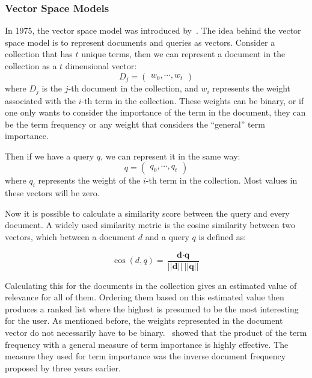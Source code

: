 \subsubsection{Vector Space Models}
In 1975, the vector space model was introduced by~\citet{VectorSpaceModel}. The idea behind the vector space model is to represent documents and queries as vectors. Consider a collection that has $t$ unique terms, then we can represent a document in the collection as a $t$ dimensional vector:
\begin{equation}
	D_j = \begin{pmatrix}
		w_0, \cdots, w_t
	\end{pmatrix}
\end{equation}
where $D_j$ is the $j$-th document in the collection, and $w_i$ represents the weight associated with the $i$-th term in the collection. These weights can be binary, or if one only wants to consider the importance of the term in the document, they can be the term frequency or any weight that considers the ``general'' term importance. 

Then if we have a query $q$, we can represent it in the same way:
\begin{equation}
	q = \begin{pmatrix}
		q_0, \cdots, q_t
	\end{pmatrix}
\end{equation}
where $q_i$ represents the weight of the $i$-th term in the collection. Most values in these vectors will be zero.

Now it is possible to calculate a similarity score between the query and every document. A widely used similarity metric is the cosine similarity between two vectors, which between a document $d$ and a query $q$ is defined as:

\begin{equation}
	\cos\left(d, q\right) = \frac{\textbf{d} \cdot \textbf{q}}{||\textbf{d}||\ ||\textbf{q}||}
\end{equation}

Calculating this for the documents in the collection gives an estimated value of relevance for all of them. Ordering them based on this estimated value then produces a ranked list where the highest is presumed to be the most interesting for the user. As mentioned before, the weights represented in the document vector do not necessarily have to be binary. ~showed that the product of the term frequency with a general measure of term importance is highly effective. The measure they used for term importance was the inverse document frequency proposed by \citet{idf} three years earlier.

